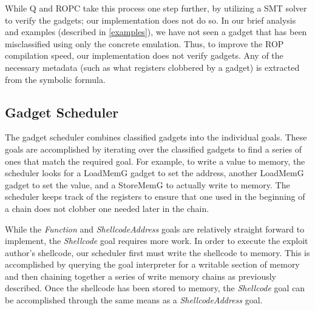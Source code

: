 \documentclass[journal]{IEEEtran}
\begin{document}
While Q \cite{schwartz2011q} and ROPC \cite{ropc} take this process one step further, by utilizing a SMT solver to verify the gadgets; our implementation does not do so.
In our brief analysis and examples (described in \ref{examples}), we have not seen a gadget that has been misclassified using only the concrete emulation.
Thus, to improve the ROP compilation speed, our implementation does not verify gadgets.
Any of the necessary metadata (such as what registers clobbered by a gadget) is extracted from the symbolic formula.

\subsection{Gadget Scheduler}\label{scheduler}
The gadget scheduler combines classified gadgets into the individual goals.
These goals are accomplished by iterating over the classified gadgets to find a series of ones that match the required goal. 
For example, to write a value to memory, the scheduler looks for a LoadMemG gadget to set the address, another LoadMemG gadget to set the value, and a StoreMemG to actually write to memory.
The scheduler keeps track of the registers to ensure that one used in the beginning of a chain does not clobber one needed later in the chain.

While the \emph{Function} and \emph{ShellcodeAddress} goals are relatively straight forward to implement, the \emph{Shellcode} goal requires more work. 
In order to execute the exploit author's shellcode, our scheduler first must write the shellcode to memory.
This is accomplished by querying the goal interpreter for a writable section of memory and then chaining together a series of write memory chains as previously described.
Once the shellcode has been stored to memory, the \emph{Shellcode} goal can be accomplished through the same means as a \emph{ShellcodeAddress} goal.
\end{document}
